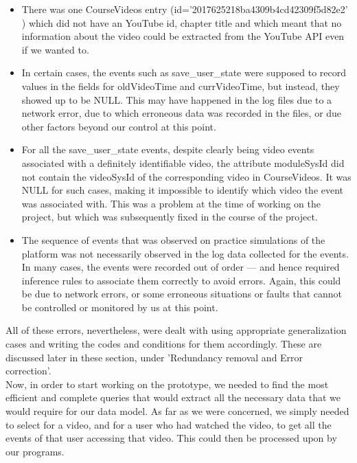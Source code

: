 \documentclass[16pt]{report}
\begin{document}
\begin{itemize}

\item There was one CourseVideos entry (id='2017625218ba4309b4cd42309f5d82e2' ) which did not have an YouTube id, chapter title and which meant that no information about the video could be extracted from the YouTube API even if we wanted to.

\item In certain cases, the events such as save\_user\_state were supposed to record values in the fields for oldVideoTime and currVideoTime, but instead, they showed up to be NULL. This may have happened in the log files due to a network error, due to which erroneous data was recorded in the files, or due other factors beyond our control at this point.

\item For all the save\_user\_state events, despite clearly being video events associated with a definitely identifiable video, the attribute moduleSysId did not contain the videoSysId of the corresponding video in CourseVideos. It was NULL for such cases, making it impossible to identify which video the event was associated with. This was a problem at the time of working on the project, but which was subsequently fixed in the course of the project.

\item The sequence of events that was observed on practice simulations of the platform was not necessarily observed in the log data collected for the events. In many cases, the events were recorded out of order --- and hence required inference rules to associate them correctly to avoid errors. Again, this could be due to network errors, or some erroneous situations or faults that cannot be controlled or monitored by us at this point.

\end{itemize}

All of these errors, nevertheless, were dealt with using appropriate generalization cases and writing the codes and conditions for them accordingly. These are discussed later in these section, under 'Redundancy removal and Error correction'.\\


Now, in order to start working on the prototype, we needed to find the most efficient and complete queries that would extract all the necessary data that we would require for our data model. As far as we were concerned, we simply needed to select for a video, and for a user who had watched the video, to get all the events of that user accessing that video. This could then be processed upon by our programs.\\
\end{document}
